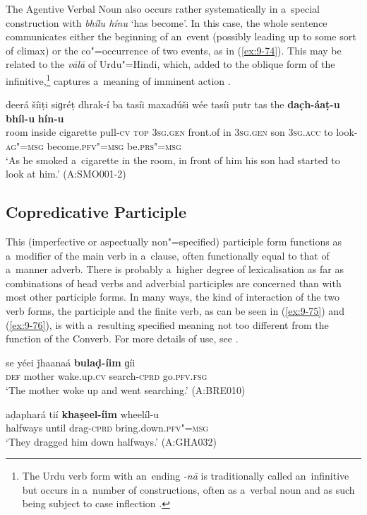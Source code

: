 The Agentive Verbal Noun also occurs rather systematically in a~special construction with \textit{bhílu hínu} `has become'. In this case, the whole sentence communicates either the beginning of an~event (possibly leading up to some sort of climax) or the co"=occurrence of two events, as in (\ref{ex:9-74}). This may be related to the \textit{vālā} of Urdu"=Hindi, which, added to the oblique form of the infinitive,\footnote{The Urdu verb form with an~ending \textit{-nā} is traditionally called an~infinitive but occurs in a~number of constructions, often as a~verbal noun and as such being subject to case inflection \citep[132--142]{schmidt1999}.} captures a~meaning of imminent action \citep[139]{schmidt1999}. 


\begin{exe}
\ex
\label{ex:9-74}
\gll deerá šíiṭi siɡréṭ dhrak-í ba tasíi maxadúši wée tasíi putr tas the \textbf{dac̣h-áaṭ-u} \textbf{bhíl-u} \textbf{hín-u} \\
room inside cigarette pull-\textsc{cv} \textsc{top} \textsc{3sg.gen} front.of in \textsc{3sg.gen} son \textsc{3sg.acc} to look-\textsc{ag"=msg} become.\textsc{pfv"=msg} be.\textsc{prs"=msg } \\
\glt `As he smoked a~cigarette in the room, in front of him his son had started to look at him.' (A:SMO001-2)
\end{exe}

\subsection{Copredicative Participle}
\label{subsec:9-3-5}

This (imperfective or aspectually non"=specified) participle form functions as a~modifier of the main verb in a~clause, often functionally equal to that of a~manner adverb. There is probably a~higher degree of lexicalisation as far as combinations of head verbs and adverbial participles are concerned than with most other participle forms. In many ways, the kind of interaction of the two verb forms, the participle and the finite verb, as can be seen in (\ref{ex:9-75}) and (\ref{ex:9-76}), is with a~resulting specified meaning not too different from the function of the Converb. For more details of use, see . 

\begin{exe}
\ex
\label{ex:9-75}
\gll se yéei ǰhaanaá \textbf{bulaḍ-íim} ɡíi\\
\textsc{def} mother wake.up.\textsc{cv} search-\textsc{cprd} go.\textsc{pfv.fsg} \\
\glt `The mother woke up and went searching.' (A:BRE010)

\ex
\label{ex:9-76}
\gll aḍaphará tií \textbf{khaṣeel-íim} wheelíl-u\\
halfways until drag-\textsc{cprd} bring.down.\textsc{pfv"=msg} \\
\glt `They dragged him down halfways.' (A:GHA032)
\end{exe}

